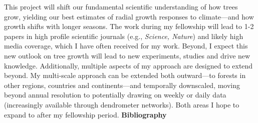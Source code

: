 \documentclass[11pt,letter,oneside]{article}
\begin{document}
This project will shift our fundamental scientific understanding of how trees grow, yielding our best estimates of radial growth responses to climate---and how growth shifts with longer seasons. The work during my fellowship will lead to 1-2 papers in high profile scientific journals (e.g., \emph{Science, Nature}) and likely high media coverage, which I have often received for my work. Beyond, I expect this new outlook on tree growth will lead to new experiments, studies and drive new knowledge. Additionally, multiple aspects of my approach are designed to extend beyond. My multi-scale approach can be extended both outward---to forests in other regions, countries and continents---and temporally downscaled, moving beyond annual resolution to potentially drawing on weekly or daily data (increasingly available through dendrometer networks). Both areas I hope to expand to after my fellowship period. 
\newpage
{}
{\bf Bibliography}
\begin{footnotesize}
\def\section*#1{}

\end{footnotesize}


\end{document}
